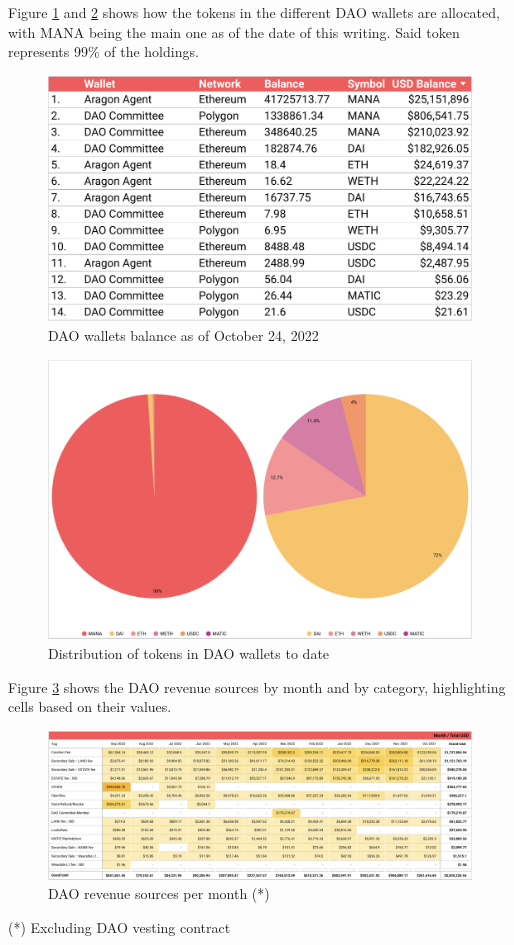 \documentclass[MSE,Master,english]{twbook}%
\begin{document}
Figure \ref{fig:dao_balance} and \ref{fig:token_distribution} shows how the tokens in the different DAO wallets are allocated, with MANA being the main one as of the date of this writing. Said token represents 99\% of the holdings.
\begin{figure}[H]
  \centering
  \includegraphics[width=\textwidth]{metrics/dao_balance.png}
  \caption{DAO wallets balance as of October 24, 2022}
  \label{fig:dao_balance}
\end{figure}
\begin{figure}[H]
  \centering
  \includegraphics[width=\textwidth]{metrics/token_distribution.png}
  \caption{Distribution of tokens in DAO wallets to date}
  \label{fig:token_distribution}
\end{figure}

Figure \ref{fig:income} shows the DAO revenue sources by month and by category, highlighting cells based on their values.
\begin{figure}[H]
  \centering
  \includegraphics[width=\textwidth]{metrics/income.png}
  \caption{DAO revenue sources per month (*)}
  \label{fig:income}
\end{figure}
(*) Excluding DAO vesting contract\cite{DAOVesting}
\end{document}
